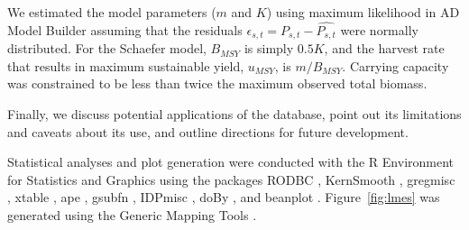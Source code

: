 \documentclass[letterpaper,review,authoryear,12pt]{elsarticle}
\begin{document}
We estimated the model parameters ($m$ and $K$) using maximum
likelihood in AD Model Builder \citep{admb} assuming that the
residuals $\epsilon_{s,t}=P_{s,t} - \hat{P_{s,t}}$ were normally
distributed.  For the Schaefer model, $B_{MSY}$ is simply $0.5K$, and the
harvest rate that results in maximum sustainable yield, $u_{MSY}$, is
$m/B_{MSY}$. Carrying capacity was constrained to be less than twice the
maximum observed total biomass.










Finally, we discuss potential applications of the database, point out
its limitations and caveats about its use, and outline directions for
future development.

Statistical analyses and plot generation were conducted with the R Environment
for Statistics and Graphics \citep{R} using the packages RODBC \citep{R:RODBC},
KernSmooth \citep{R:KernSmooth}, gregmisc \citep{R:gregmisc}, xtable \citep{R:xtable}, ape \citep{R:ape}, gsubfn \citep{R:gsubfn}, IDPmisc \citep{R:IDPmisc}, doBy \citep{R:doBy}, and beanplot \citep{R:beanplot}. Figure~\ref{fig:lmes} was generated using the
Generic Mapping Tools \citep{gmt}.
\end{document}

